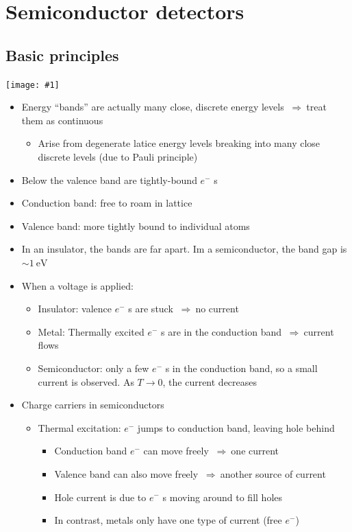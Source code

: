 \documentclass[11pt]{article}
\newcommand{\ev}{\text{eV}}
\newcommand{\el}{\ensuremath{e^{-}}\xspace}
\newcommand{\thus}{$~\Rightarrow~$}
\newcommand{\embedimgw}[2]{\begin{center}\texttt{[image: \#1]}\end{center}}
\begin{document}
\section{Semiconductor detectors}
\subsection{Basic principles}
\embedimgw{figs/bandstructure.png}{.8}
\begin{itemize}
  \item Energy ``bands'' are actually many close, discrete energy levels \thus treat them as continuous
  \begin{itemize}
    \item Arise from degenerate latice energy levels breaking into many close discrete levels (due to Pauli principle)
  \end{itemize}
  \item Below the valence band are tightly-bound \el s
  \item Conduction band: free to roam in lattice
  \item Valence band: more tightly bound to individual atoms
  \item In an insulator, the bands are far apart. Im a semiconductor, the band gap is $\sim 1~\ev$
  \item When a voltage is applied:
  \begin{itemize}
    \item Insulator: valence \el s are stuck \thus no current
    \item Metal: Thermally excited \el s are in the conduction band \thus current flows
    \item Semiconductor: only a few \el s in the conduction band, so a small current is observed. As $T\rightarrow 0$, the current decreases
  \end{itemize}
  \item Charge carriers in semiconductors
  \begin{itemize}
    \item Thermal excitation: \el jumps to conduction band, leaving hole behind
    \begin{itemize}
      \item Conduction band \el can move freely \thus one current
      \item Valence band can also move freely \thus another source of current
      \item Hole current is due to \el s moving around to fill holes
      \item In contrast, metals only have one type of current (free \el)

\end{itemize}
\end{itemize}
\end{itemize}
\end{document}
